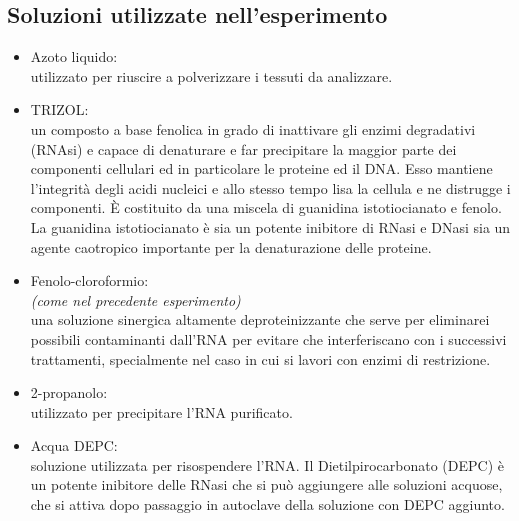 \documentclass{extarticle}
\begin{document}
\subsection*{Soluzioni utilizzate nell'esperimento}
\begin{itemize}
    \item Azoto liquido:\\
    utilizzato per riuscire a polverizzare i tessuti da analizzare.
    \item TRIZOL:\\
    un composto a base fenolica in grado di inattivare gli enzimi degradativi (RNAsi) e capace di denaturare e far precipitare la maggior parte dei componenti cellulari ed in particolare le proteine ed il DNA. Esso mantiene l'integrità degli acidi nucleici e allo stesso tempo lisa la cellula e ne distrugge i componenti. È costituito da una miscela di guanidina istotiocianato e fenolo. La guanidina istotiocianato è sia un potente inibitore di RNasi e DNasi sia un agente caotropico importante per la denaturazione delle proteine. 
    \item Fenolo-cloroformio:\\
    \textit{(come nel precedente esperimento)}\\ una soluzione sinergica altamente deproteinizzante che serve per eliminarei possibili contaminanti dall'RNA per evitare che interferiscano con i successivi trattamenti, specialmente nel caso in cui si lavori con enzimi di restrizione.
    \item 2-propanolo:\\
    utilizzato per precipitare l'RNA purificato.
    \item Acqua DEPC:\\
    soluzione utilizzata per risospendere l'RNA. Il Dietilpirocarbonato (DEPC) è un potente inibitore delle RNasi che si può aggiungere alle soluzioni acquose, che si attiva dopo passaggio in autoclave della soluzione con DEPC aggiunto.
\end{itemize}
\end{document}
